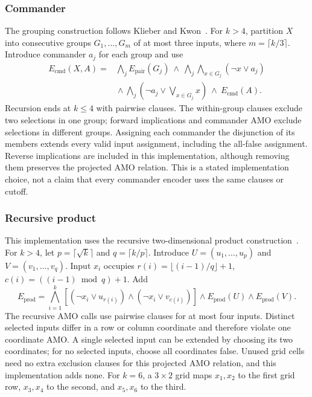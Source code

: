 \subsubsection{Commander}
The grouping construction follows Klieber and Kwon~\cite{commander}.
For $k>4$, partition $X$ into consecutive groups $G_1,\ldots,G_m$ of
at most three inputs, where $m=\lceil k/3\rceil$. Introduce commander
$a_j$ for each group and use
\begin{align}
E_{\mathrm{cmd}}(X,A)={}&
\bigwedge_j E_{\mathrm{pair}}(G_j)\ \wedge\
\bigwedge_j\bigwedge_{x\in G_j}(\neg x\vee a_j)\nonumber\\
&{}\wedge\bigwedge_j\left(\neg a_j\vee\bigvee_{x\in G_j}x\right)
\ \wedge\ E_{\mathrm{cmd}}(A).
\end{align}
Recursion ends at $k\le4$ with pairwise clauses. The within-group clauses
exclude two selections in one group; forward implications and commander
AMO exclude selections in different groups. Assigning each commander the
disjunction of its members extends every valid input assignment, including
the all-false assignment. Reverse implications are included in this
implementation, although removing them preserves the projected AMO
relation. This is a stated implementation choice, not a claim that every
commander encoder uses the same clauses or cutoff.

\subsubsection{Recursive product}
This implementation uses the recursive two-dimensional product
construction~\cite{product}. For $k>4$, let $p=\lceil\sqrt{k}\rceil$
and $q=\lceil k/p\rceil$. Introduce $U=(u_1,\ldots,u_p)$ and
$V=(v_1,\ldots,v_q)$. Input $x_i$ occupies
$r(i)=\lfloor(i-1)/q\rfloor+1$, $c(i)=((i-1)\bmod q)+1$. Add
\begin{equation}
E_{\mathrm{prod}}=
\bigwedge_{i=1}^k
\left[(\neg x_i\vee u_{r(i)})\wedge(\neg x_i\vee v_{c(i)})\right]
\wedge E_{\mathrm{prod}}(U)\wedge E_{\mathrm{prod}}(V).
\end{equation}
The recursive AMO calls use pairwise clauses for at most four inputs.
Distinct selected inputs differ in a row or column coordinate and
therefore violate one coordinate AMO. A single selected input can be
extended by choosing its two coordinates; for no selected inputs, choose
all coordinates false. Unused grid cells need no extra exclusion clauses
for this projected AMO relation, and this implementation adds none.
For $k=6$, a $3\times2$ grid maps $x_1,x_2$ to the first grid row,
$x_3,x_4$ to the second, and $x_5,x_6$ to the third.

